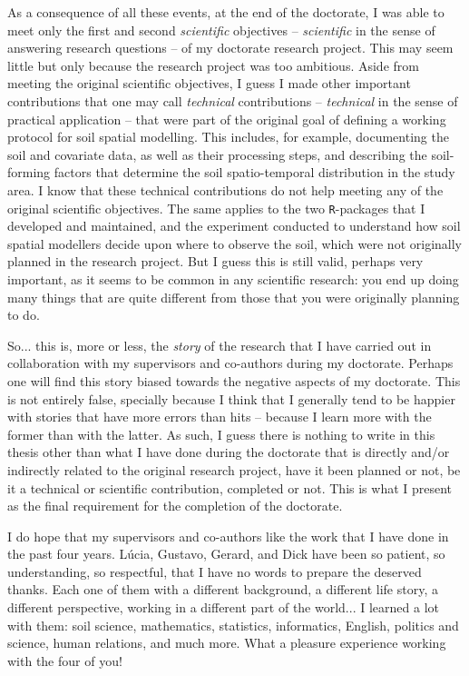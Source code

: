As a consequence of all these events, at the end of the doctorate, I was able to meet only the first and second 
\emph{scientific} objectives -- \emph{scientific} in the sense of answering research questions -- of my 
doctorate research project. This may seem little but only because the research project was too ambitious. Aside 
from meeting the original scientific objectives, I guess I made other important contributions that one may call 
\emph{technical} contributions -- \emph{technical} in the sense of practical application -- that were part of 
the original goal of defining a working protocol for soil spatial modelling. This includes, for example, 
documenting the soil and covariate data, as well as their processing steps, and describing the soil-forming 
factors that determine the soil spatio-temporal distribution in the study area. I know that these technical 
contributions do not help meeting any of the original scientific objectives. The same applies to the two 
\texttt{R}-packages that I developed and maintained, and the experiment conducted to understand how soil 
spatial modellers decide upon where to observe the soil, which were not originally planned in the research 
project. But I guess this is still valid, perhaps very important, as it seems to be common in any scientific 
research: you end up doing many things that are quite different from those that you were originally planning to 
do.

So... this is, more or less, the \emph{story} of the research that I have carried out in collaboration with my 
supervisors and co-authors during my doctorate. Perhaps one will find this story biased towards the negative 
aspects of my doctorate. This is not entirely false, specially because I think that I generally tend to be 
happier with stories that have more errors than hits -- because I learn more with the former than with the 
latter. As such, I guess there is nothing to write in this thesis other than what I have done during the 
doctorate that is directly and/or indirectly related to the original research project, have it been planned or 
not, be it a technical or scientific contribution, completed or not. This is what I present as the final 
requirement for the completion of the doctorate.

I do hope that my supervisors and co-authors like the work that I have done in the past four years. Lúcia, 
Gustavo, Gerard, and Dick have been so patient, so understanding, so respectful, that I have no words to 
prepare the deserved thanks. Each one of them with a different background, a different life story, a different 
perspective, working in a different part of the world... I learned a lot with them: soil science, mathematics, 
statistics, informatics, English, politics and science, human relations, and much more. What a pleasure 
experience working with the four of you!

